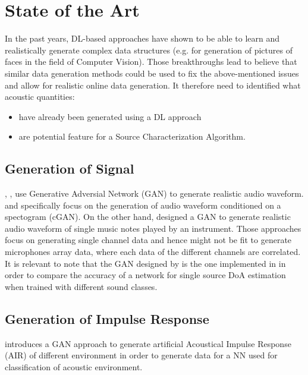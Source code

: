 \documentclass[11pt,a4paper,twoside]{report}
\begin{document}
\section{State of the Art}

In the past years, DL-based approaches have shown to be able to learn and realistically generate complex data structures (e.g. \cite{karras2017progressive} for generation of pictures of faces in the field of Computer Vision). Those breakthroughs lead to believe that similar data generation methods could be used to fix the above-mentioned issues and allow for realistic online data generation. It therefore need to identified what acoustic quantities:
\begin{itemize}
    \item have already been generated using a DL approach
    \item are potential feature for a Source Characterization Algorithm.
\end{itemize}

\subsection{Generation of Signal}

\cite{neekhara2019expediting}, \cite{NEURIPS2019_6804c9bc}, \cite{engel2019gansynth} use Generative Adversial Network (GAN) to generate realistic audio waveform. \cite{neekhara2019expediting} and \cite{NEURIPS2019_6804c9bc} specifically focus on the generation of audio waveform conditioned on a spectogram (cGAN). On the other hand, \cite{engel2019gansynth} designed a GAN to generate realistic audio waveform of single music notes played by an instrument. Those approaches focus on generating single channel data and hence might not be fit to generate microphones array data, where each data of the different channels are correlated. It is relevant to note that the GAN designed by \cite{neekhara2019expediting} is the one implemented in \cite{vargas2021improved} in order to compare the accuracy of a network for single source DoA estimation when trained with different sound classes.

\subsection{Generation of Impulse Response}

\cite{papayiannis2019data} introduces a GAN approach to generate artificial Acoustical Impulse Response (AIR) of different environment in order to generate data for a NN used for classification of acoustic environment.
\end{document}

